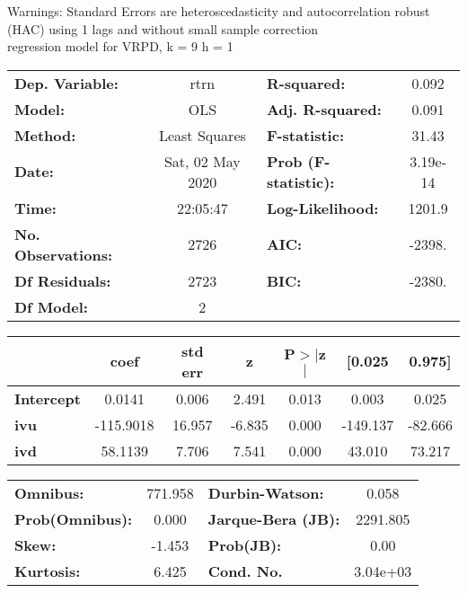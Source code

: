 Warnings: \newline
 [1] Standard Errors are heteroscedasticity and autocorrelation robust (HAC) using 1 lags and without small sample correction\\ 

regression model for VRPD, k = 9 h = 1\begin{center}
\begin{tabular}{lclc}
\toprule
\textbf{Dep. Variable:}    &       rtrn       & \textbf{  R-squared:         } &     0.092   \\
\textbf{Model:}            &       OLS        & \textbf{  Adj. R-squared:    } &     0.091   \\
\textbf{Method:}           &  Least Squares   & \textbf{  F-statistic:       } &     31.43   \\
\textbf{Date:}             & Sat, 02 May 2020 & \textbf{  Prob (F-statistic):} &  3.19e-14   \\
\textbf{Time:}             &     22:05:47     & \textbf{  Log-Likelihood:    } &    1201.9   \\
\textbf{No. Observations:} &        2726      & \textbf{  AIC:               } &    -2398.   \\
\textbf{Df Residuals:}     &        2723      & \textbf{  BIC:               } &    -2380.   \\
\textbf{Df Model:}         &           2      & \textbf{                     } &             \\
\bottomrule
\end{tabular}
\begin{tabular}{lcccccc}
                   & \textbf{coef} & \textbf{std err} & \textbf{z} & \textbf{P$> |$z$|$} & \textbf{[0.025} & \textbf{0.975]}  \\
\midrule
\textbf{Intercept} &       0.0141  &        0.006     &     2.491  &         0.013        &        0.003    &        0.025     \\
\textbf{ivu}       &    -115.9018  &       16.957     &    -6.835  &         0.000        &     -149.137    &      -82.666     \\
\textbf{ivd}       &      58.1139  &        7.706     &     7.541  &         0.000        &       43.010    &       73.217     \\
\bottomrule
\end{tabular}
\begin{tabular}{lclc}
\textbf{Omnibus:}       & 771.958 & \textbf{  Durbin-Watson:     } &    0.058  \\
\textbf{Prob(Omnibus):} &   0.000 & \textbf{  Jarque-Bera (JB):  } & 2291.805  \\
\textbf{Skew:}          &  -1.453 & \textbf{  Prob(JB):          } &     0.00  \\
\textbf{Kurtosis:}      &   6.425 & \textbf{  Cond. No.          } & 3.04e+03  \\
\bottomrule
\end{tabular}
\end{center}

